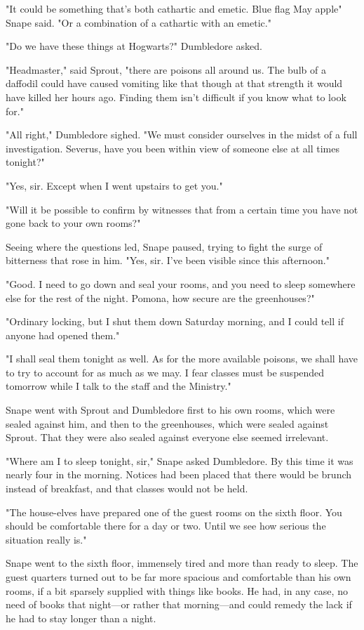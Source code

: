 "It could be something that's both cathartic and emetic. Blue flag{\el} May apple{\el}" Snape said. "Or a combination of a cathartic with an emetic."

"Do we have these things at Hogwarts?" Dumbledore asked.

"Headmaster," said Sprout, "there are poisons all around us. The bulb of a daffodil could have caused vomiting like that{\el} though at that strength it would have killed her hours ago. Finding them isn't difficult if you know what to look for."

"All right," Dumbledore sighed. "We must consider ourselves in the midst of a full investigation. Severus, have you been within view of someone else at all times tonight?"

"Yes, sir. Except when I went upstairs to get you."

"Will it be possible to confirm by witnesses that from a certain time you have not gone back to your own rooms?"

Seeing where the questions led, Snape paused, trying to fight the surge of bitterness that rose in him. "Yes, sir. I've been visible since this afternoon."

"Good. I need to go down and seal your rooms, and you need to sleep somewhere else for the rest of the night. Pomona, how secure are the greenhouses?"

"Ordinary locking, but I shut them down Saturday morning, and I could tell if anyone had opened them."

"I shall seal them tonight as well. As for the more available poisons, we shall have to try to account for as much as we may. I fear classes must be suspended tomorrow while I talk to the staff and the Ministry."

Snape went with Sprout and Dumbledore first to his own rooms, which were sealed against him, and then to the greenhouses, which were sealed against Sprout. That they were also sealed against everyone else seemed irrelevant.

"Where am I to sleep tonight, sir," Snape asked Dumbledore. By this time it was nearly four in the morning. Notices had been placed that there would be brunch instead of breakfast, and that classes would not be held.

"The house-elves have prepared one of the guest rooms on the sixth floor. You should be comfortable there for a day or two. Until we see how serious the situation really is."

Snape went to the sixth floor, immensely tired and more than ready to sleep. The guest quarters turned out to be far more spacious and comfortable than his own rooms, if a bit sparsely supplied with things like books. He had, in any case, no need of books that night—or rather that morning—and could remedy the lack if he had to stay longer than a night.

